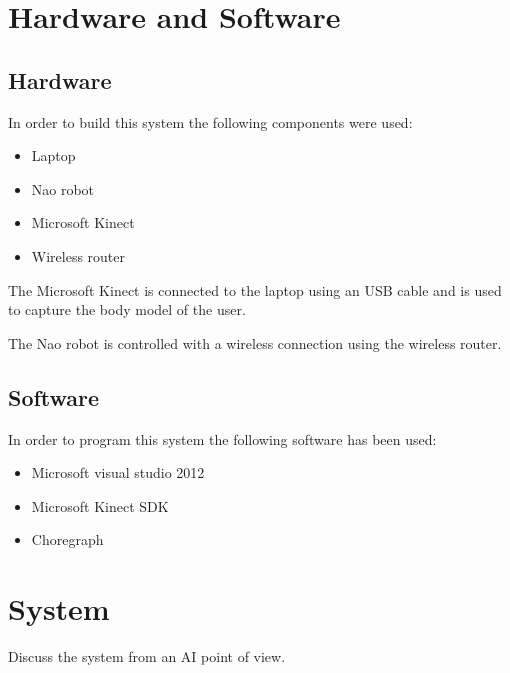 \documentclass[10pt,a4paper,oneside]{scrartcl}
\begin{document}
\section{Hardware and Software}

\subsection{Hardware}
In order to build this system the following components were used:
\begin{itemize}
  \item Laptop
  \item Nao robot
  \item Microsoft Kinect
  \item Wireless router
\end{itemize}

The Microsoft Kinect is connected to the laptop using an USB cable and is used to capture the body model of the user. 

The Nao robot is controlled with a wireless connection using the wireless router. 

\subsection{Software}
In order to program this system the following software has been used:
\begin{itemize}
  \item Microsoft visual studio 2012
  \item Microsoft Kinect SDK
  \item Choregraph
\end{itemize}


\section{System}
Discuss the system from an AI point of view.

\end{document}

